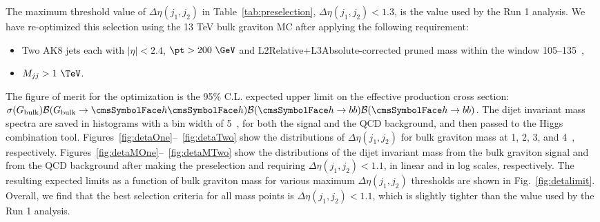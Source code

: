 The maximum threshold value of $\Delta \eta (j_1,j_2)$ in 
Table~\ref{tab:preselection}, 
$\Delta \eta (j_1,j_2)<1.3$, is the value used by the Run 1 
analysis.  
We have re-optimized this selection using the 13 TeV bulk graviton MC after 
applying the following requirement:
\begin{itemize}
\item Two AK8 jets each with $|\eta|<2.4$, $\pt>200~\GeV$ and 
L2Relative+L3Absolute-corrected pruned mass within the window 105--135~\GeV,
\item $M_{jj} > 1~\TeV$.
\end{itemize}

The figure of merit for the optimization is the 95\% C.L. expected upper limit 
on the effective production cross section: 
$\sigma(G_\mathrm{bulk}){\cal B}(G_\mathrm{bulk}\rightarrow \Ph\Ph){\cal B}(\Ph\rightarrow bb){\cal B}(\Ph\rightarrow bb)$. 
The dijet invariant mass spectra are saved in histograms with a bin width of 
5~\GeV, for both the signal and the QCD background, and then passed to 
the Higgs combination tool. 
Figures~\ref{fig:detaOne}--~\ref{fig:detaTwo} show the distributions of 
$\Delta \eta (j_1,j_2)$ for bulk graviton mass at 1, 2, 3, and 4~\TeV, 
respectively. 
Figures~\ref{fig:detaMOne}--~\ref{fig:detaMTwo} show the distributions of 
the dijet invariant mass from the bulk graviton signal and from the QCD background 
after making the preselection and requiring $\Delta \eta (j_1,j_2) < 1.1$, in 
linear and in log scales, respectively. 
The resulting expected limits as a function of bulk graviton mass for various 
maximum $\Delta \eta (j_1,j_2)$ thresholds are shown in Fig.~\ref{fig:detalimit}. 
Overall, we find that the best selection criteria for all mass points is 
$\Delta \eta (j_1,j_2)<1.1$, which is slightly tighter than the value used by 
 the Run 1 analysis.


